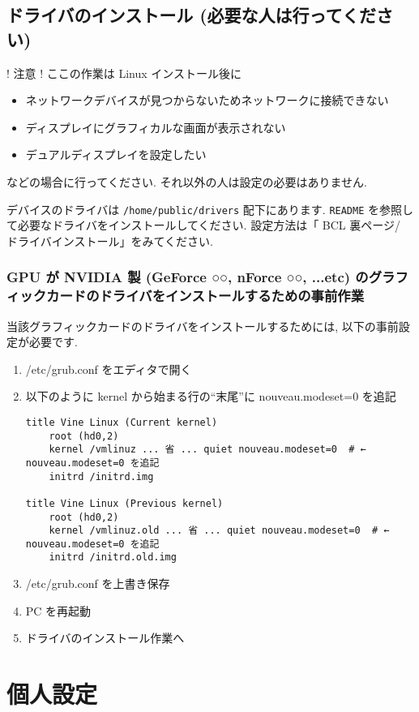 \documentclass{jarticle}
\begin{document}
\subsection{ドライバのインストール (必要な人は行ってください)}
! 注意 ! ここの作業は Linux インストール後に
\begin{itemize}
	\item ネットワークデバイスが見つからないためネットワークに接続できない
	\item ディスプレイにグラフィカルな画面が表示されない
	\item デュアルディスプレイを設定したい
\end{itemize}
などの場合に行ってください.
それ以外の人は設定の必要はありません.

デバイスのドライバは \verb|/home/public/drivers| 配下にあります.
 \verb|README| を参照して必要なドライバをインストールしてください.
設定方法は「 BCL 裏ページ/ ドライバインストール」をみてください.

\subsubsection{GPU が NVIDIA 製 (GeForce ○○, nForce ○○, ...etc) のグラフィックカードのドライバをインストールするための事前作業}

当該グラフィックカードのドライバをインストールするためには,
以下の事前設定が必要です.
\begin{enumerate}
	\item /etc/grub.conf をエディタで開く
	\item 以下のように kernel から始まる行の``末尾''に nouveau.modeset=0 を追記
\begin{verbatim}
title Vine Linux (Current kernel)
    root (hd0,2)
    kernel /vmlinuz ... 省 ... quiet nouveau.modeset=0  # ← nouveau.modeset=0 を追記
    initrd /initrd.img

title Vine Linux (Previous kernel)
    root (hd0,2)
    kernel /vmlinuz.old ... 省 ... quiet nouveau.modeset=0  # ← nouveau.modeset=0 を追記
    initrd /initrd.old.img
\end{verbatim}
	\item /etc/grub.conf を上書き保存
	\item PC を再起動
	\item ドライバのインストール作業へ
\end{enumerate}

\section{個人設定}
\end{document}
